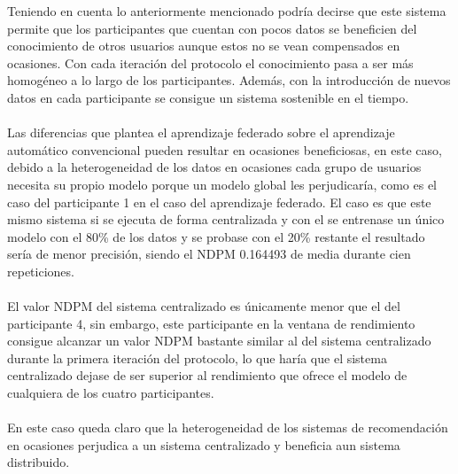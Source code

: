 Teniendo en cuenta lo anteriormente mencionado podría decirse que este sistema permite que los participantes que cuentan con pocos datos se beneficien del conocimiento de otros usuarios aunque estos no se vean compensados en ocasiones. Con cada iteración del protocolo el conocimiento pasa a ser más homogéneo a lo largo de los participantes. Además, con la introducción de nuevos datos en cada participante se consigue un sistema sostenible en el tiempo.
\\ \\
Las diferencias que plantea el aprendizaje federado sobre el aprendizaje automático convencional pueden resultar en ocasiones beneficiosas, en este caso, debido a la heterogeneidad de los datos en ocasiones cada grupo de usuarios necesita su propio modelo porque un modelo global les perjudicaría, como es el caso del participante 1 en el caso del aprendizaje federado. El caso es que este mismo sistema si se ejecuta de forma centralizada y con el se entrenase un único modelo con el 80\% de los datos y se probase con el 20\% restante el resultado sería de menor precisión, siendo el NDPM 0.164493 de media durante cien repeticiones.
\\ \\
El valor NDPM del sistema centralizado es únicamente menor que el del participante 4, sin embargo, este participante en la ventana de rendimiento consigue alcanzar un valor NDPM bastante similar al del sistema centralizado durante la primera iteración del protocolo, lo que haría que el sistema centralizado dejase de ser superior al rendimiento que ofrece el modelo de cualquiera de los cuatro participantes. 
\\ \\
En este caso queda claro que la heterogeneidad de los sistemas de recomendación en ocasiones perjudica a un sistema centralizado y beneficia aun sistema distribuido. 